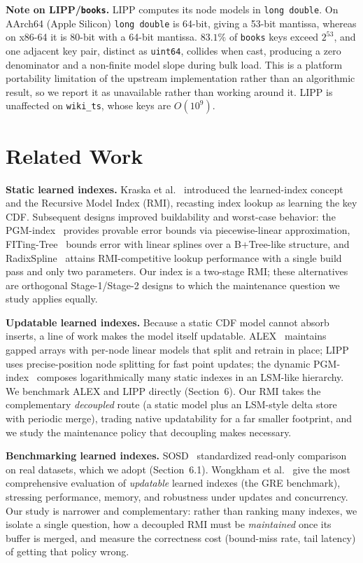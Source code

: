 \documentclass[sigconf, nonacm]{acmart}
\begin{document}
\medskip
\noindent\textbf{Note on LIPP/\texttt{books}.} LIPP computes its node models in \texttt{long double}. On AArch64 (Apple Silicon) \texttt{long double} is 64-bit, giving a 53-bit mantissa, whereas on x86-64 it is 80-bit with a 64-bit mantissa. $83.1\%$ of \texttt{books} keys exceed $2^{53}$, and one adjacent key pair, distinct as \texttt{uint64}, collides when cast, producing a zero denominator and a non-finite model slope during bulk load. This is a platform portability limitation of the upstream implementation rather than an algorithmic result, so we report it as unavailable rather than working around it. LIPP is unaffected on \texttt{wiki\_ts}, whose keys are $O(10^9)$.

\section{Related Work}

\noindent\textbf{Static learned indexes.} Kraska et al.~\cite{kraska2018case} introduced the learned-index concept and the Recursive Model Index (RMI), recasting index lookup as learning the key CDF. Subsequent designs improved buildability and worst-case behavior: the PGM-index~\cite{ferragina2020pgm} provides provable error bounds via piecewise-linear approximation, FITing-Tree~\cite{galakatos2019fiting} bounds error with linear splines over a B+Tree-like structure, and RadixSpline~\cite{kipf2020radixspline} attains RMI-competitive lookup performance with a single build pass and only two parameters. Our index is a two-stage RMI; these alternatives are orthogonal Stage-1/Stage-2 designs to which the maintenance question we study applies equally.

\noindent\textbf{Updatable learned indexes.} Because a static CDF model cannot absorb inserts, a line of work makes the model itself updatable. ALEX~\cite{ding2020alex} maintains gapped arrays with per-node linear models that split and retrain in place; LIPP~\cite{wu2021lipp} uses precise-position node splitting for fast point updates; the dynamic PGM-index~\cite{ferragina2020pgm} composes logarithmically many static indexes in an LSM-like hierarchy. We benchmark ALEX and LIPP directly (Section~6). Our RMI takes the complementary \emph{decoupled} route (a static model plus an LSM-style delta store~\cite{oneil1996log} with periodic merge), trading native updatability for a far smaller footprint, and we study the maintenance policy that decoupling makes necessary.

\noindent\textbf{Benchmarking learned indexes.} SOSD~\cite{marcus2020benchmarking} standardized read-only comparison on real datasets, which we adopt (Section~6.1). Wongkham et al.~\cite{wongkham2022updatable} give the most comprehensive evaluation of \emph{updatable} learned indexes (the GRE benchmark), stressing performance, memory, and robustness under updates and concurrency. Our study is narrower and complementary: rather than ranking many indexes, we isolate a single question, how a decoupled RMI must be \emph{maintained} once its buffer is merged, and measure the correctness cost (bound-miss rate, tail latency) of getting that policy wrong.
\end{document}
